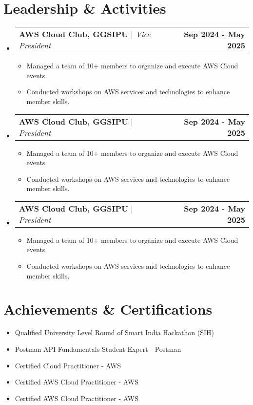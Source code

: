 \documentclass[a4paper,10pt]{article}
\makeatletter
\newcommand{\resumeItem}[1]{\item\small{{#1 \vspace{-2pt}}}}
\newcommand{\resumeProjectHeading}[2]{
    \item
    \begin{tabular*}{1.001\textwidth}{l@{\extracolsep{\fill}}r}
      \small#1 & \textbf{\small #2}\\
    \end{tabular*}\vspace{-7pt}
}
\newcommand{\resumeSubHeadingListStart}{\begin{itemize}[leftmargin=0.0in, label={}]}
\newcommand{\resumeSubHeadingListEnd}{\end{itemize}}
\newcommand{\resumeItemListStart}{\begin{itemize}}
\newcommand{\resumeItemListEnd}{\end{itemize}\vspace{-5pt}}
\makeatother
\begin{document}
\section{Leadership \& Activities}
  \vspace{-4pt}
    \resumeSubHeadingListStart
        \resumeProjectHeading
          {\textbf{AWS Cloud Club, GGSIPU} $|$ \emph{Vice President}} {Sep 2024 - May 2025}
          \vspace{-8pt}
          \resumeItemListStart
            \resumeItem{Managed a team of 10+ members to organize and execute AWS Cloud events.}
            \resumeItem{Conducted workshops on AWS services and technologies to enhance member skills.}
          \resumeItemListEnd
          \vspace{-8pt}
          
        \resumeProjectHeading
          {\textbf{AWS Cloud Club, GGSIPU} $|$ \emph{President}} {Sep 2024 - May 2025}
          \vspace{-8pt}
          \resumeItemListStart
            \resumeItem{Managed a team of 10+ members to organize and execute AWS Cloud events.}
            \resumeItem{Conducted workshops on AWS services and technologies to enhance member skills.}
          \resumeItemListEnd
          \vspace{-8pt}

        \resumeProjectHeading
          {\textbf{AWS Cloud Club, GGSIPU} $|$ \emph{President}} {Sep 2024 - May 2025}
          \vspace{-8pt}
          \resumeItemListStart
            \resumeItem{Managed a team of 10+ members to organize and execute AWS Cloud events.}
            \resumeItem{Conducted workshops on AWS services and technologies to enhance member skills.}
          \resumeItemListEnd
          \vspace{0pt}

    \resumeSubHeadingListEnd
\vspace{-8pt}

\section{Achievements \& Certifications}
    \resumeItemListStart
        \resumeItem{Qualified University Level Round of Smart India Hackathon (SIH)}
        \resumeItem{Postman API Fundamentals Student Expert - Postman}
        \resumeItem{Certified Cloud Practitioner - AWS}
        \resumeItem{Certified AWS Cloud Practitioner - AWS}
        \resumeItem{Certified AWS Cloud Practitioner - AWS}

    \resumeItemListEnd
\end{document}
